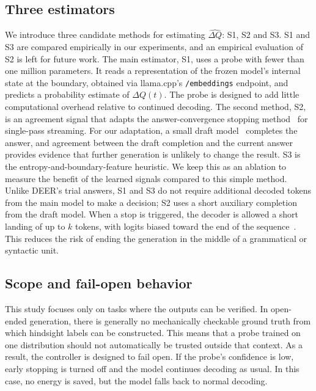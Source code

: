 \documentclass[review,12pt]{elsarticle}
\newcommand{\dq}{\widehat{\Delta Q}}
\begin{document}
\subsection{Three estimators}
\label{sec:estimators}
We introduce three candidate methods for estimating $\dq$: S1, S2 and S3. S1 and S3
are compared empirically in our experiments, and an empirical
evaluation of S2 is left for future work.
The main estimator, S1, uses a probe with fewer than one million parameters.
It reads a representation of the frozen model's internal state at the
boundary, obtained via llama.cpp's \texttt{/embeddings} endpoint, and
predicts a probability estimate of $\Delta Q(t)$. The probe is designed to add little computational overhead relative to continued decoding. The second method, S2,  is an agreement signal that adapts
the answer-convergence stopping method~\cite{liu2025answerconv,fu2025dynasor} for
single-pass streaming. For our adaptation, a small draft model~\cite{leviathan2023speculative} completes the answer, and agreement between the draft completion and the current answer provides evidence that further generation is unlikely to change the result. S3 is the
entropy-and-boundary-feature heuristic. We keep this as an ablation to measure
the benefit of the learned signals compared to this simple method.
Unlike DEER's trial answers, S1 and S3 do not require additional decoded tokens from the main model to make a decision; S2 uses a short auxiliary completion from the draft model. When a stop is triggered, the decoder is allowed a short landing of up to $k$ tokens, with logits biased toward the end of the sequence~\cite{liu2025answerconv}. This reduces the risk of ending the generation in the middle of a grammatical or syntactic unit.

\subsection{Scope and fail-open behavior}
\label{sec:scope}
This study focuses only on tasks where the outputs can be verified.
In open-ended generation, there is generally no mechanically checkable
ground truth from which hindsight labels can be constructed. This means
that a probe trained on one distribution should not automatically be
trusted outside that context. As a result, the controller is designed to
fail open. If the probe's confidence is low, early stopping is turned off
and the model continues decoding as usual. In this case, no energy is saved,
but the model falls back to normal decoding.
\end{document}
